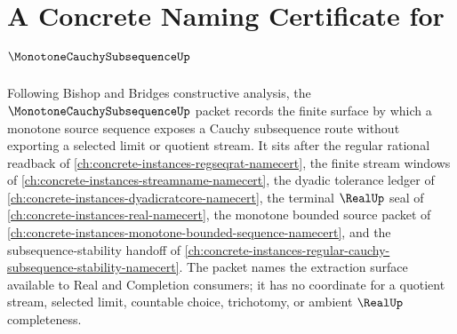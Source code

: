 \chapter{A Concrete Naming Certificate for $\MonotoneCauchySubsequenceUp$}
\label{ch:concrete-instances-monotone-cauchy-subsequence-namecert}

Following Bishop and Bridges constructive analysis, the $\MonotoneCauchySubsequenceUp$ packet records the finite surface by which a monotone source sequence exposes a Cauchy subsequence route without exporting a selected limit or quotient stream. It sits after the regular rational readback of \autoref{ch:concrete-instances-regseqrat-namecert}, the finite stream windows of \autoref{ch:concrete-instances-streamname-namecert}, the dyadic tolerance ledger of \autoref{ch:concrete-instances-dyadicratcore-namecert}, the terminal $\RealUp$ seal of \autoref{ch:concrete-instances-real-namecert}, the monotone bounded source packet of \autoref{ch:concrete-instances-monotone-bounded-sequence-namecert}, and the subsequence-stability handoff of \autoref{ch:concrete-instances-regular-cauchy-subsequence-stability-namecert}. The packet names the extraction surface available to Real and Completion consumers; it has no coordinate for a quotient stream, selected limit, countable choice, trichotomy, or ambient $\RealUp$ completeness.

